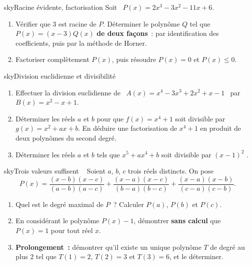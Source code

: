 
\begin{exo}{sky}{Racine évidente, factorisation }
Soit \ $P(x)=2x^3-3x^2-11x+6$.
\begin{enumerate}
  \item Vérifier que $3$ est racine de $P$. Déterminer le polynôme $Q$ tel que $P(x)=(x-3)Q(x)$ \textbf{de deux façons}~: par identification des coefficients, puis par la méthode de Horner.
  \item Factoriser complètement $P(x)$, puis résoudre $P(x)=0$ et $P(x)\leq0$.
\end{enumerate}
\end{exo}

\begin{exo}{sky}{Division euclidienne et divisibilité }
\begin{enumerate}
  \item Effectuer la division euclidienne de \ $A(x)=x^4-3x^3+2x^2+x-1$ \ par \ $B(x)=x^2-x+1$.
  \item Déterminer les réels $a$ et $b$ pour que $f(x)=x^4+1$ soit divisible par $g(x)=x^2+ax+b$. En déduire une factorisation de $x^4+1$ en produit de deux polynômes du second degré.
  \item Déterminer les réels $a$ et $b$ tels que $x^5+ax^4+b$ soit divisible par $(x-1)^2$ .
\end{enumerate}
\end{exo}

\begin{exo}{sky}{Trois valeurs suffisent \demo\ }
Soient $a$, $b$, $c$ trois réels distincts. On pose
\[ P(x)=\frac{(x-b)(x-c)}{(a-b)(a-c)}+\frac{(x-a)(x-c)}{(b-a)(b-c)}+\frac{(x-a)(x-b)}{(c-a)(c-b)}. \]
\begin{enumerate}
  \item Quel est le degré maximal de $P$~? Calculer $P(a)$, $P(b)$ et $P(c)$.
  \item En considérant le polynôme $P(x)-1$, démontrer \textbf{sans calcul} que $P(x)=1$ pour tout réel $x$.
  \item \textbf{Prolongement~:} démontrer qu'il existe un unique polynôme $T$ de degré au plus $2$ tel que $T(1)=2$, $T(2)=3$ et $T(3)=6$, et le déterminer.
\end{enumerate}
\end{exo}

